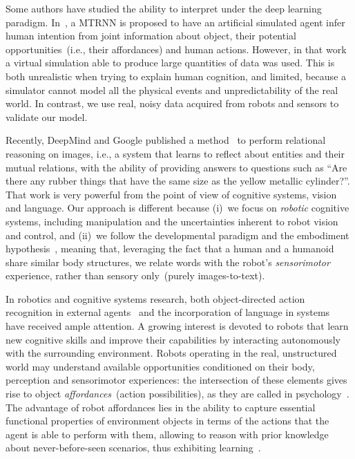 Some authors have studied the ability to interpret under the deep learning paradigm.
In~\cite{kim:2017:nn}, a \ac{MTRNN} is proposed to have an artificial simulated agent infer human intention from joint information about object, their potential opportunities~(i.e., their affordances) and human actions.
However, in that work a virtual simulation able to produce large quantities of data was used.
This is both unrealistic when trying to explain human cognition, and limited, because a simulator cannot model all the physical events and unpredictability of the real world.
In contrast, we use real, noisy data acquired from robots and sensors to validate our model.

Recently, DeepMind and Google published a method~\cite{santoro:2017:relational_reasoning} to perform relational reasoning on images, i.e., a system that learns to reflect about entities and their mutual relations, with the ability of providing answers to questions such as ``Are there any rubber things that have the same size as the yellow metallic cylinder?''.
That work is very powerful from the point of view of cognitive systems, vision and language.
Our approach is different because (i)~we focus on \emph{robotic} cognitive systems, including manipulation and the uncertainties inherent to robot vision and control, and (ii)~we follow the developmental paradigm and the embodiment hypothesis~\cite{lungarella:2003:devrobsurvey}, meaning that, leveraging the fact that a human and a humanoid share similar body structures, we relate words with the robot's \emph{sensorimotor} experience, rather than sensory only~(purely images-to-text).

In robotics and cognitive systems research, both object-directed action recognition in external agents~\cite{koppula:2013:ijrr} and the incorporation of language in \hr{} systems~\cite{harnad:1990,matuszek:2014:aaai} have received ample attention.
A growing interest is devoted to robots that learn new cognitive skills and improve their capabilities by interacting autonomously with the surrounding environment.
Robots operating in the real, unstructured world may understand available opportunities conditioned on their body, perception and sensorimotor experiences: the intersection of these elements gives rise to object \emph{affordances}~(action possibilities), as they are called in psychology~\cite{gibson:2014}.
The advantage of robot affordances lies in the ability to capture essential functional properties of environment objects in terms of the actions that the agent is able to perform with them, allowing to reason with prior knowledge about never-before-seen scenarios, thus exhibiting learning~\cite{montesano:2008,jamone:2016:tcds}.

